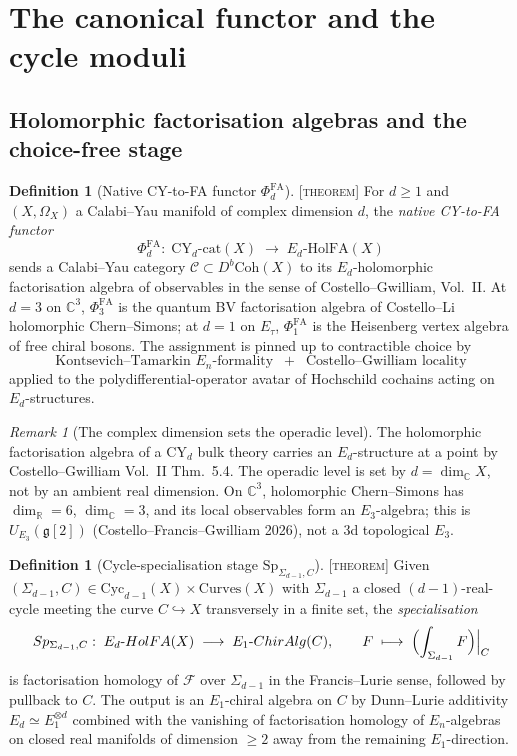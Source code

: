 \documentclass[11pt]{amsart}
\providecommand{\C}{\mathbb{C}}
\providecommand{\R}{\mathbb{R}}
\providecommand{\g}{\mathfrak{g}}
\providecommand{\cC}{\mathcal{C}}
\providecommand{\cF}{\mathcal{F}}
\providecommand{\HolFA}{\mathrm{HolFA}}
\providecommand{\ChirAlg}{\mathrm{ChirAlg}}
\providecommand{\Coh}{\mathrm{Coh}}
\providecommand{\Sp}{\mathrm{Sp}}
\providecommand{\Cyc}{\mathrm{Cyc}}
\providecommand{\Eone}{E_1}
\providecommand{\Ethree}{E_3}
\providecommand{\Ed}{E_d}
\providecommand{\En}{E_n}
\providecommand{\PhiFA}{\Phi^{\mathrm{FA}}}
\providecommand{\ClaimStatusTheorem}{\textsc{[theorem]}}
\theoremstyle{plain}
\theoremstyle{definition}
\newtheorem{definition}[theorem]{Definition}
\theoremstyle{remark}
\newtheorem{remark}[theorem]{Remark}
\begin{document}
\section{The canonical functor and the cycle moduli}

\subsection{Holomorphic factorisation algebras and the choice-free stage}

\begin{definition}[Native CY-to-FA functor $\PhiFA_d$]
\label{def:phi-FA}
\ClaimStatusTheorem{}\;
For $d\geq 1$ and $(X,\Omega_X)$ a Calabi--Yau manifold of complex
dimension $d$, the \emph{native CY-to-FA functor}
\[
\PhiFA_d:\;
\mathrm{CY}_d\text{-cat}(X)\;\longrightarrow\;
\Ed\text{-}\HolFA(X)
\]
sends a Calabi--Yau category $\cC\subset D^b\Coh(X)$ to its
$\Ed$-holomorphic factorisation algebra of observables in the sense of
Costello--Gwilliam, Vol.~II. At $d=3$ on $\C^3$, $\PhiFA_3$ is the
quantum BV factorisation algebra of Costello--Li holomorphic
Chern--Simons; at $d=1$ on $E_\tau$, $\PhiFA_1$ is the Heisenberg
vertex algebra of free chiral bosons. The assignment is pinned up to
contractible choice by
\[
\text{Kontsevich--Tamarkin $\En$-formality}
\;\;+\;\;
\text{Costello--Gwilliam locality}
\]
applied to the polydifferential-operator avatar of Hochschild
cochains acting on $\Ed$-structures.
\end{definition}

\begin{remark}[The complex dimension sets the operadic level]
\label{rem:complex-dim-sets-En}
The holomorphic factorisation algebra of a CY$_d$ bulk theory carries
an $\Ed$-structure at a point by Costello--Gwilliam
Vol.~II Thm.~5.4. The operadic level is set by $d=\dim_\C X$, not by
an ambient real dimension. On $\C^3$, holomorphic Chern--Simons has
$\dim_\R=6$, $\dim_\C = 3$, and its local observables form an
$\Ethree$-algebra; this is $U_{\Ethree}(\g[2])$ (Costello--Francis--Gwilliam
2026), not a $3$d topological $\Ethree$.
\end{remark}

\begin{definition}[Cycle-specialisation stage $\Sp_{\Sigma_{d-1},C}$]
\label{def:sp-cycle}
\ClaimStatusTheorem{}\;
Given $(\Sigma_{d-1},C)\in\Cyc_{d-1}(X)\times\mathrm{Curves}(X)$ with
$\Sigma_{d-1}$ a closed $(d-1)$-real-cycle meeting the curve
$C\hookrightarrow X$ transversely in a finite set, the
\emph{specialisation}
\[
\Sp_{\Sigma_{d-1},C}:\;
\Ed\text{-}\HolFA(X)\;\longrightarrow\;\Eone\text{-}\ChirAlg(C),
\qquad
\cF\;\longmapsto\;\Bigl(\int_{\Sigma_{d-1}}\cF\Bigr)\Big|_{C}
\]
is factorisation homology of $\cF$ over $\Sigma_{d-1}$ in the
Francis--Lurie sense, followed by pullback to $C$. The output is an
$\Eone$-chiral algebra on $C$ by Dunn--Lurie additivity
$\Ed\simeq\Eone^{\otimes d}$ combined with the vanishing of
factorisation homology of $\En$-algebras on closed real manifolds of
dimension $\geq 2$ away from the remaining $\Eone$-direction.
\end{definition}
\end{document}
